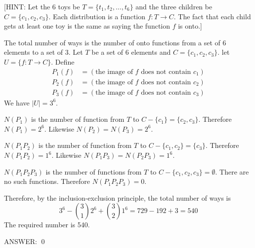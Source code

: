 
[HINT: Let the 6 toys be $T = \{t_1, t_2, \ldots, t_6\}$ and 
the three children be $C = \{c_1, c_2, c_3\}$.
Each distribution is a function $f : T \rightarrow C$.
The fact that each child gets at least one toy is the same as saying
the function $f$ is onto.]

The total number of ways is the number of onto functions from a set
of 6 elements to a set of 3.
Let $T$ be a set of 6 elements and $C = \{c_1, c_2, c_3\}$.
let $U = \{f : T \rightarrow C\}$.
Define
\begin{align*}
P_1(f) &= (\text{the image of $f$ does not contain $c_1$})\\
P_2(f) &= (\text{the image of $f$ does not contain $c_2$})\\
P_3(f) &= (\text{the image of $f$ does not contain $c_3$})
\end{align*}
We have $|U| = 3^6$.

$N(P_1)$ is the number of function from $T$ to $C - \{c_1\} = \{c_2, c_3\}$.
Therefore $N(P_1) = 2^6$.
Likewise $N(P_2) = N(P_3) = 2^6$.

$N(P_1 P_2)$ 
is the number of function from $T$ to $C - \{c_1, c_2\} = \{c_3\}$.
Therefore $N(P_1 P_2) = 1^6$.
Likewise $N(P_1 P_3) = N(P_2 P_3) = 1^6$.

$N(P_1 P_2 P_3)$ is the number of functions from $T$ to $C - \{c_1, c_2, c_3\}
 = \emptyset$. There are no such functions.
Therefore $N(P_1 P_2 P_3) = 0$.

Therefore, by the inclusion-exclusion principle, 
the total number of ways is
\[
3^6
- \binom{3}{1} 2^6
+ \binom{3}{2} 1^6
= 729 - 192 + 3
= 540
\] 
The required number is 540.

ANSWER: 
\qed

